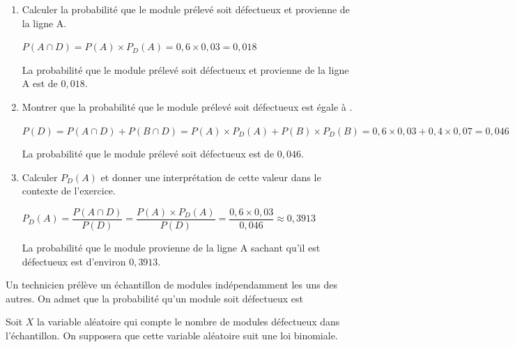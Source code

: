     
\begin{enumerate}[resume=monDS]
    \item Calculer la probabilité que le module prélevé soit défectueux et provienne de la ligne A.
     \begin{blocvisiblex}[height=2.5]
    {\quad}
    $P(A\cap D)=P(A) \times P_D(A)=0,6 \times 0,03=0,018$

    \smallskip
    La probabilité que le module prélevé soit défectueux et provienne de la ligne A est de $0,018$.
     \end{blocvisiblex}
     \medskip
    \item Montrer que la probabilité que le module prélevé soit défectueux est égale à .
    \begin{blocvisiblex}[height=2.5]
    {\quad}
    $P(D)=P(A\cap D)+P(B\cap D)=P(A) \times P_D(A)+P(B) \times P_D(B)=0,6 \times 0,03+0,4 \times 0,07=0,046$

        \smallskip
    La probabilité que le module prélevé soit défectueux est de $0,046$.
    \end{blocvisiblex}
    \medskip
    \item Calculer $P_D(A)$ et donner une interprétation de cette valeur dans le contexte de l'exercice.
    \begin{blocvisiblex}[height=2.5]
    {\quad}
    $P_D(A)=\dfrac{P(A\cap D)}{P(D)}=\dfrac{P(A) \times P_D(A)}{P(D)}=\dfrac{0,6 \times 0,03}{0,046}\approx 0,3913$

        \smallskip
    La probabilité que le module provienne de la ligne A sachant qu'il est défectueux est d'environ $0,3913$.
     \end{blocvisiblex}
     \medskip
     
\end{enumerate}

Un technicien prélève un échantillon de  modules indépendamment les uns des autres. On admet que la probabilité qu'un module soit défectueux est 

Soit $X$ la variable aléatoire qui compte le nombre de modules défectueux dans l'échantillon. On supposera que cette variable aléatoire suit une loi binomiale.

